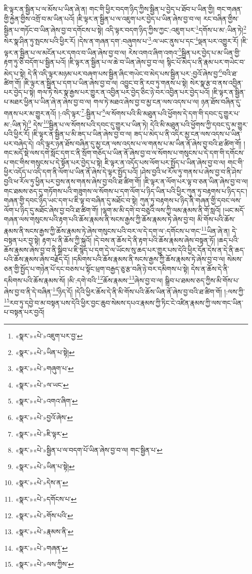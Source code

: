 ཇི་ལྟར་ན་སྦྱིན་པ་ལ་མོས་པ་ཡིན་ཞེ་ན། གང་གི་ཕྱིར་བདག་ཉིད་ཀྱིས་སྦྱིན་པ་བྱེད་པ་ཐོབ་པ་ཡིན་གྱི། གང་གཞན་གྱི་རྐྱེན་གྱིས་འགྲོ་བ་མ་ཡིན་པའོ། །ཇི་ལྟར་ན་སྦྱིན་པ་ལ་འཇུག་པར་བྱེད་པ་ཡིན་ཞེས་བྱ་བ་ལ། རང་བཞིན་གྱིས་སྦྱིན་པ་གཏོང་བ་ཡིན་ཞེས་བྱ་བ་དགོངས་པ་སྟེ། འདི་ལྟར་བདག་ཉིད་ཀྱིས་ཀྱང་:འཇུག་པར་\footnote{«སྣར་»«པེ་»འཇུག་པར་བྱ་}དགོས་པ་མ་:ཡིན་ཏེ།\footnote{«སྣར་»«པེ་»ཡིན་པ་སྟེ།} སེར་སྣ་ཤིན་ཏུ་སྤངས་པའི་ཕྱིར་རོ། །དེས་ན་གཞན་དག་:བཞུགས་པ་\footnote{«སྣར་»«པེ་»གཞུག་པ་}:ལ་ཡང་ནུས་པ་དང་\footnote{«སྣར་»«པེ་»ལ་ཡང་}ལྡན་པར་འགྱུར་རོ། །ཇི་ལྟར་ན་སྦྱིན་པ་ལ་མངོན་པར་དགའ་བ་ཡིན་ཞེས་བྱ་བ་ལ། རེས་འགའ་ཞིག་འགའ་\footnote{«སྣར་»«པེ་»འགའ་ཞིག་}སྦྱིན་པར་བྱེད་པ་མ་ཡིན་གྱི་རྟག་ཏུ་ཅི་བདོག་པ་སྦྱིན་པའོ། །ཇི་ལྟར་ན་སྦྱིན་པ་ལ་ཆེ་བ་ཡིན་ཞེས་བྱ་བ་ལ། སྙིང་པོ་མེད་པ་ནི་རྣམ་པར་གཡེང་བ་མེད་པ་སྟེ། དེ་ནི་འདི་ལྟར་མཉམ་པར་བཞག་པས་སྦྱིན་ཞིང་གཡེང་བ་མེད་པས་སྦྱིན་པར་:བྱའོ་ཞེས་བྱ་\footnote{«སྣར་»«པེ་»བྱའོ་ཞེས་}བའི་ཐ་ཚིག་གོ། །ཇི་ལྟར་ན་སྦྱིན་པ་དག་པ་ཡིན་ཞེས་བྱ་བ་ལ། འབྱུང་བ་ནི་རབ་ཏུ་གནས་པ་སྟེ། སེར་སྣ་རྩ་བ་ནས་འབྱིན་པར་བྱེད་པ་སྟེ། གལ་ཏེ་སེར་སྣ་རྒྱས་པར་གྱུར་ན་འབྱིན་པར་བྱེད་ཅིང་ཉེ་བར་འབྱིན་པར་བྱེད་པའོ། །ཇི་ལྟར་ན་སྦྱིན་པ་མཐར་ཕྱིན་པ་ཡིན་ཞེ་ན་ཞེས་བྱ་བ་ལ། གལ་ཏེ་མཐའ་ཞེས་བྱ་བ་མྱ་ངན་ལས་འདས་པ་ལ། ཉན་ཐོས་བཞིན་དུ་གནས་པར་མ་གྱུར་ནའོ། །:འདི་ལྟར་\footnote{«སྣར་»«པེ་»ཇི་ལྟར་}:སྦྱིན་པ་\footnote{«སྣར་»«པེ་»སྦྱིན་པ་ལ་བདག་པོ་ཡིན་ཞེས་བྱ་བ་ལ། གང་སྦྱིན་པ་}ལ་སོགས་པའི་མི་མཐུན་པའི་ཕྱོགས་དེ་དག་གི་དབང་དུ་གྱུར་པ་མ་:ཡིན་ཏེ།\footnote{«སྣར་»«པེ་»ཡིན་པ་སྟེ།} དེས་\footnote{«སྣར་»«པེ་»དེས་ན་}སྦྱིན་པ་ལ་སོགས་པའི་དབང་དུ་གྱུར་པ་ཡིན་ཏེ། དེའི་མི་མཐུན་པའི་ཕྱོགས་ཀྱི་དབང་དུ་མ་གྱུར་པའི་ཕྱིར་རོ། །ཇི་ལྟར་ན་སྦྱིན་པ་མི་ཟད་པ་ཡིན་ཞེས་བྱ་བ་ལ། ཟད་པ་མེད་པ་ནི་འདིར་མྱ་ངན་ལས་འདས་པ་ཡིན་པར་བཞེད་དེ། འདི་ལྟར་ཉན་ཐོས་བཞིན་དུ་མྱ་ངན་ལས་འདས་པ་ལ་གནས་པ་མ་ཡིན་ནོ་ཞེས་བྱ་བའི་ཐ་ཚིག་གོ། །གང་མདོ་སྡེ་ལས་དགེ་སློང་དག་ང་ནི་སྲོག་གཅོད་པ་ཡིན་ནོ་ཞེས་བྱ་བ་ལ་སོགས་པ་གསུངས་པ་དེ་དག་གི་དགོངས་པ་གང་གིས་གསུངས་པ་དེ་སྟོན་པར་བྱེད་པ་སྟེ། ཇི་ལྟར་ན་འདོད་པས་ལོག་པར་སྤྱོད་པ་ཡིན་ཞེས་བྱ་བ་ལ། གང་གི་ཕྱིར་འདོད་པ་འདི་དག་ནི་ལོག་པ་ཡིན་ནོ་ཞེས་དེ་ལྟར་སྤྱོད་པའོ། །ཤེས་བྱའི་ཕ་རོལ་ཏུ་གནས་པ་ཞེས་བྱ་བ་ནི་ཤེས་བྱའི་ཕ་རོལ་ཏུ་ཕྱིན་པར་བྱས་ནས་གནས་ཞེས་བྱ་བའི་ཐ་ཚིག་གོ། །ཇི་ལྟར་ན་ལོག་པར་ལྟ་བ་ཅན་ཡིན་ཞེས་བྱ་བ་ལ། གང་ཐམས་ཅད་དུ་གཏོགས་པའི་གཟུགས་ལ་སོགས་པ་དག་ལོག་པ་ཉིད་ཡིན་པའི་ཕྱིར་ཀུན་ཏུ་བརྟགས་པ་ཉིད་དང་། གཞན་གྱི་དབང་ཉིད་ཡང་དག་པ་ཇི་ལྟ་བ་བཞིན་དུ་མཐོང་བ་སྟེ། ཀུན་ཏུ་བརྟགས་པ་ཉིད་ནི་གཞན་གྱི་དབང་ལས་ལོག་པ་ཉིད་དུ་མཐོང་ཞེས་བྱ་བའི་ཐ་ཚིག་གོ། །ལྷག་མ་མི་དགེ་བ་བཅུའི་ལས་ཀྱི་ལམ་རྣམས་ནི་གོ་སླའོ། །ཡང་མདོ་གཞན་ལས་གསུངས་པའི་རྟག་པའི་ཆོས་རྣམས་ནི་སངས་རྒྱས་ཀྱི་ཆོས་རྣམས་ཏེ་ཞེས་བྱ་བ། མི་གོས་པའི་ཆོས་རྣམས་ནི་སངས་རྒྱས་ཀྱི་ཆོས་རྣམས་ཏེ་ཞེས་གསུངས་པའི་བར་ལ་དེ་དག་ལ་:དགོངས་པ་གང་\footnote{«སྣར་»«པེ་»དགོངས་པ་}ཡིན་ཞེ་ན། དེ་བསྟན་པར་བྱ་སྟེ། རྟག་པ་ནི་ཆོས་ཀྱི་སྐུའོ། །དེ་བས་ན་ཆོས་དེ་ནི་རྟག་པའི་ཆོས་རྣམས་ཞེས་བསྟན་ཏོ། །ཆད་པའི་ཆོས་རྣམས་ཞེས་བྱ་བ་ནི་སྒྲིབ་པ་ཇི་སྙེད་པ་དག་དེ་ལ་ཡོངས་སུ་ཆད་པར་གྱུར་པས་དེའི་ཕྱིར་དོན་དེས་ན་དེ་ནི་ཆད་པའི་ཆོས་རྣམས་ཞེས་བརྗོད་དོ། །དམིགས་པའི་ཆོས་རྣམས་ནི་སངས་རྒྱས་ཀྱི་ཆོས་རྣམས་ཏེ་ཞེས་བྱ་བ་ལ། སེམས་ཅན་གྱི་སྤྱོད་པ་གཉེན་པོ་དང་བཅས་པ་སྟོང་ཕྲག་བརྒྱད་ཅུ་རྩ་བཞི་ཉེ་བར་དམིགས་པ་སྟེ། དེས་ན་ཆོས་དེ་ནི་དམིགས་པའི་ཆོས་རྣམས་སོ། །མི་:དགེ་བའི་\footnote{«སྣར་»«པེ་»གོས་པའི་}ཆོས་རྣམས་\footnote{«སྣར་»«པེ་»རྣམས་ནི་}ཞེས་བྱ་བ་ལ། སྒྲིབ་པ་ཐམས་ཅད་ཀྱིས་མི་གོས་པ་ཞེས་བྱ་བ་ནི་དེ་བཞིན་\footnote{«སྣར་»«པེ་»གཞན་}ཉིད་དོ། །དེའི་ཕྱིར་ཆོས་དེ་ནི་མི་གོས་པའི་ཆོས་ཡིན་ནོ་ཞེས་བྱ་བའི་ཐ་ཚིག་གོ། །:ལས་ཀྱི་\footnote{«སྣར་»«པེ་»ལས་ཀྱིས་}རབ་ཏུ་དབྱེ་བ་མ་བསྟན་པས་དེའི་ཕྱིར་བྱང་ཆུབ་སེམས་དཔའ་རྣམས་ཀྱི་ཏིང་ངེ་འཛིན་རྣམས་ཀྱི་ལས་གང་ཡིན་པ་བསྟན་པར་བྱའོ། 